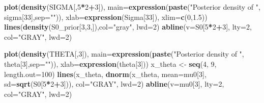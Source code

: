 \documentclass[12pt]{article}
\newenvironment{Shaded}{\begin{snugshade}}{\end{snugshade}}
\newcommand{\AttributeTok}[1]{\textcolor[rgb]{0.13,0.29,0.53}{#1}}
\newcommand{\DecValTok}[1]{\textcolor[rgb]{0.00,0.00,0.81}{#1}}
\newcommand{\FloatTok}[1]{\textcolor[rgb]{0.00,0.00,0.81}{#1}}
\newcommand{\FunctionTok}[1]{\textcolor[rgb]{0.13,0.29,0.53}{\textbf{#1}}}
\newcommand{\NormalTok}[1]{#1}
\newcommand{\OtherTok}[1]{\textcolor[rgb]{0.56,0.35,0.01}{#1}}
\newcommand{\SpecialCharTok}[1]{\textcolor[rgb]{0.81,0.36,0.00}{\textbf{#1}}}
\newcommand{\StringTok}[1]{\textcolor[rgb]{0.31,0.60,0.02}{#1}}
\begin{document}
\begin{Shaded}
\begin{Highlighting}[]
\FunctionTok{plot}\NormalTok{(}\FunctionTok{density}\NormalTok{(SIGMA[,}\DecValTok{5}\SpecialCharTok{*}\DecValTok{2}\SpecialCharTok{+}\DecValTok{3}\NormalTok{]), }
     \AttributeTok{main=}\FunctionTok{expression}\NormalTok{(}\FunctionTok{paste}\NormalTok{(}\StringTok{"Posterior density of "}\NormalTok{, sigma[}\DecValTok{33}\NormalTok{],}\AttributeTok{sep=}\StringTok{""}\NormalTok{)), }
     \AttributeTok{xlab=}\FunctionTok{expression}\NormalTok{(Sigma[}\DecValTok{33}\NormalTok{]), }\AttributeTok{xlim=}\FunctionTok{c}\NormalTok{(}\DecValTok{0}\NormalTok{,}\FloatTok{1.5}\NormalTok{))}
\FunctionTok{lines}\NormalTok{(}\FunctionTok{density}\NormalTok{(S0\_prior[}\DecValTok{3}\NormalTok{,}\DecValTok{3}\NormalTok{,]),}\AttributeTok{col=}\StringTok{"gray"}\NormalTok{, }\AttributeTok{lwd=}\DecValTok{2}\NormalTok{)}
\FunctionTok{abline}\NormalTok{(}\AttributeTok{v=}\NormalTok{S0[}\DecValTok{5}\SpecialCharTok{*}\DecValTok{2}\SpecialCharTok{+}\DecValTok{3}\NormalTok{], }\AttributeTok{lty=}\DecValTok{2}\NormalTok{, }\AttributeTok{col=}\StringTok{"GRAY"}\NormalTok{, }\AttributeTok{lwd=}\DecValTok{2}\NormalTok{)}

\FunctionTok{plot}\NormalTok{(}\FunctionTok{density}\NormalTok{(THETA[,}\DecValTok{3}\NormalTok{]), }
     \AttributeTok{main=}\FunctionTok{expression}\NormalTok{(}\FunctionTok{paste}\NormalTok{(}\StringTok{"Posterior density of "}\NormalTok{, theta[}\DecValTok{3}\NormalTok{],}\AttributeTok{sep=}\StringTok{""}\NormalTok{)), }
     \AttributeTok{xlab=}\FunctionTok{expression}\NormalTok{(theta[}\DecValTok{3}\NormalTok{]))}
\NormalTok{x\_theta }\OtherTok{\textless{}{-}} \FunctionTok{seq}\NormalTok{(}\DecValTok{4}\NormalTok{, }\DecValTok{9}\NormalTok{, }\AttributeTok{length.out=}\DecValTok{100}\NormalTok{)}
\FunctionTok{lines}\NormalTok{(x\_theta, }\FunctionTok{dnorm}\NormalTok{(x\_theta, }\AttributeTok{mean=}\NormalTok{mu0[}\DecValTok{3}\NormalTok{], }\AttributeTok{sd=}\FunctionTok{sqrt}\NormalTok{(S0[}\DecValTok{5}\SpecialCharTok{*}\DecValTok{2}\SpecialCharTok{+}\DecValTok{3}\NormalTok{])), }
      \AttributeTok{col=}\StringTok{"GRAY"}\NormalTok{, }\AttributeTok{lwd=}\DecValTok{2}\NormalTok{)}
\FunctionTok{abline}\NormalTok{(}\AttributeTok{v=}\NormalTok{mu0[}\DecValTok{3}\NormalTok{], }\AttributeTok{lty=}\DecValTok{2}\NormalTok{, }\AttributeTok{col=}\StringTok{"GRAY"}\NormalTok{, }\AttributeTok{lwd=}\DecValTok{2}\NormalTok{)}


\end{Highlighting}
\end{Shaded}
\end{document}
